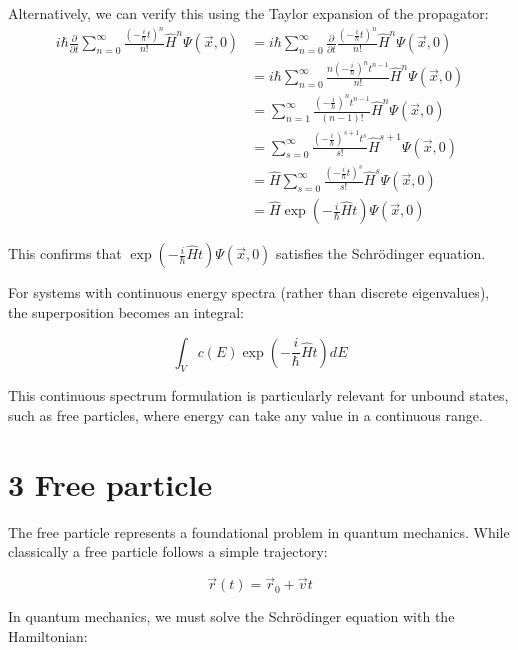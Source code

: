 \documentclass[italian]{HKNdocument}
\begin{document}
Alternatively, we can verify this using the Taylor expansion of the propagator:
\begin{align*}
i\hbar\frac{\partial}{\partial t}\sum_{n=0}^{\infty}\frac{\left(-\frac{i}{\hbar}t\right)^n}{n!}\hat{H}^n\Psi(\vec{x},0) &= i\hbar\sum_{n=0}^{\infty}\frac{\partial}{\partial t}\frac{\left(-\frac{i}{\hbar}t\right)^n}{n!}\hat{H}^n\Psi(\vec{x},0) \\
&= i\hbar\sum_{n=0}^{\infty}\frac{n\left(-\frac{i}{\hbar}\right)^nt^{n-1}}{n!}\hat{H}^n\Psi(\vec{x},0) \\
&= \sum_{n=1}^{\infty}\frac{\left(-\frac{i}{\hbar}\right)^nt^{n-1}}{(n-1)!}\hat{H}^n\Psi(\vec{x},0) \tag{2.15} \\
&= \sum_{s=0}^{\infty}\frac{\left(-\frac{i}{\hbar}\right)^{s+1}t^s}{s!}\hat{H}^{s+1}\Psi(\vec{x},0) \\
&= \hat{H}\sum_{s=0}^{\infty}\frac{\left(-\frac{i}{\hbar}t\right)^s}{s!}\hat{H}^s\Psi(\vec{x},0) \\
&= \hat{H}\exp\left(-\frac{i}{\hbar}\hat{H}t\right)\Psi(\vec{x},0)
\end{align*}

This confirms that $\exp\left(-\frac{i}{\hbar}\hat{H}t\right)\Psi(\vec{x},0)$ satisfies the Schrödinger equation.

For systems with continuous energy spectra (rather than discrete eigenvalues), the superposition becomes an integral:

\begin{equation*}
\int_V c(E)\exp\left(-\frac{i}{\hbar}\hat{H}t\right)dE \tag{2.16}
\end{equation*}

This continuous spectrum formulation is particularly relevant for unbound states, such as free particles, where energy can take any value in a continuous range.


\section*{3 Free particle}

The free particle represents a foundational problem in quantum mechanics. While classically a free particle follows a simple trajectory:

\begin{equation*}
\vec{r}(t) = \vec{r}_0 + \vec{v}t \tag{3.1}
\end{equation*}

In quantum mechanics, we must solve the Schrödinger equation with the Hamiltonian:
\end{document}
